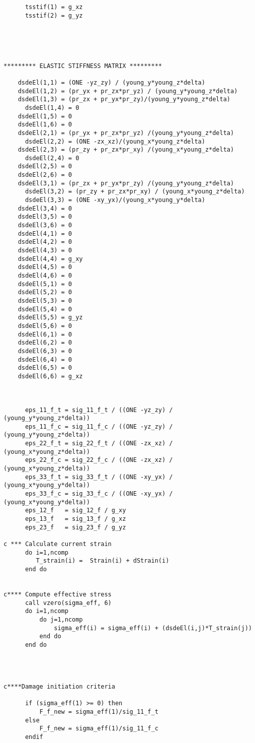 \begin{lstlisting}
      tsstif(1) = g_xz
      tsstif(2) = g_yz      

	


     
********* ELASTIC STIFFNESS MATRIX *********
	
	dsdeEl(1,1) = (ONE -yz_zy) / (young_y*young_z*delta)
	dsdeEl(1,2) = (pr_yx + pr_zx*pr_yz) / (young_y*young_z*delta)
	dsdeEl(1,3) = (pr_zx + pr_yx*pr_zy)/(young_y*young_z*delta)
      dsdeEl(1,4) = 0
	dsdeEl(1,5) = 0
	dsdeEl(1,6) = 0
	dsdeEl(2,1) = (pr_yx + pr_zx*pr_yz) /(young_y*young_z*delta)
      dsdeEl(2,2) = (ONE -zx_xz)/(young_x*young_z*delta)
	dsdeEl(2,3) = (pr_zy + pr_zx*pr_xy) /(young_x*young_z*delta) 
      dsdeEl(2,4) = 0
	dsdeEl(2,5) = 0
	dsdeEl(2,6) = 0
	dsdeEl(3,1) = (pr_zx + pr_yx*pr_zy) /(young_y*young_z*delta) 
      dsdeEl(3,2) = (pr_zy + pr_zx*pr_xy) / (young_x*young_z*delta)
      dsdeEl(3,3) = (ONE -xy_yx)/(young_x*young_y*delta)
	dsdeEl(3,4) = 0
	dsdeEl(3,5) = 0
	dsdeEl(3,6) = 0
	dsdeEl(4,1) = 0
	dsdeEl(4,2) = 0 
	dsdeEl(4,3) = 0
	dsdeEl(4,4) = g_xy
	dsdeEl(4,5) = 0
	dsdeEl(4,6) = 0
	dsdeEl(5,1) = 0
	dsdeEl(5,2) = 0 
	dsdeEl(5,3) = 0
	dsdeEl(5,4) = 0
	dsdeEl(5,5) = g_yz
	dsdeEl(5,6) = 0
	dsdeEl(6,1) = 0
	dsdeEl(6,2) = 0 
	dsdeEl(6,3) = 0
	dsdeEl(6,4) = 0
	dsdeEl(6,5) = 0
	dsdeEl(6,6) = g_xz

  
      
      eps_11_f_t = sig_11_f_t / ((ONE -yz_zy) / (young_y*young_z*delta))
      eps_11_f_c = sig_11_f_c / ((ONE -yz_zy) / (young_y*young_z*delta))
      eps_22_f_t = sig_22_f_t / ((ONE -zx_xz) / (young_x*young_z*delta))
      eps_22_f_c = sig_22_f_c / ((ONE -zx_xz) / (young_x*young_z*delta))
      eps_33_f_t = sig_33_f_t / ((ONE -xy_yx) / (young_x*young_y*delta))
      eps_33_f_c = sig_33_f_c / ((ONE -xy_yx) / (young_x*young_y*delta))
      eps_12_f   = sig_12_f / g_xy
      eps_13_f   = sig_13_f / g_xz 
      eps_23_f   = sig_23_f / g_yz

c *** Calculate current strain
      do i=1,ncomp
         T_strain(i) =  Strain(i) + dStrain(i) 
      end do

      
c**** Compute effective stress 
      call vzero(sigma_eff, 6)
      do i=1,ncomp
          do j=1,ncomp
              sigma_eff(i) = sigma_eff(i) + (dsdeEl(i,j)*T_strain(j))        
          end do
      end do        
      


      
c****Damage initiation criteria
 
      if (sigma_eff(1) >= 0) then                    
          F_f_new = sigma_eff(1)/sig_11_f_t          
      else           
          F_f_new = sigma_eff(1)/sig_11_f_c  
      endif
            

\end{lstlisting}
